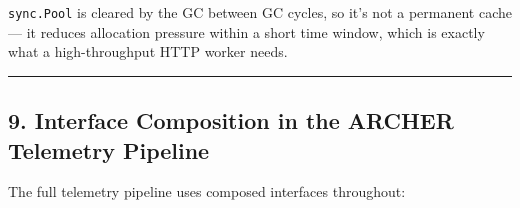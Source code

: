 \documentclass[
]{article}
\begin{document}
\texttt{sync.Pool} is cleared by the GC between GC cycles, so it's not a
permanent cache --- it reduces allocation pressure within a short time
window, which is exactly what a high-throughput HTTP worker needs.

\begin{center}\rule{0.5\linewidth}{0.5pt}\end{center}

\hypertarget{interface-composition-in-the-archer-telemetry-pipeline}{%
\subsection{9. Interface Composition in the ARCHER Telemetry
Pipeline}\label{interface-composition-in-the-archer-telemetry-pipeline}}

The full telemetry pipeline uses composed interfaces throughout:
\end{document}
